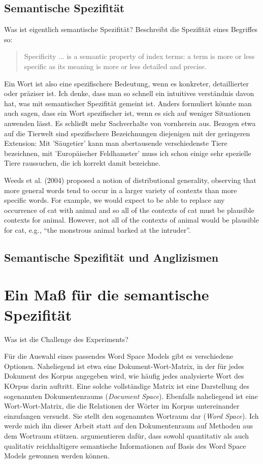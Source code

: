 \documentclass[11pt,numbers=noenddot]{scrartcl}
\begin{document}
\subsection*{Semantische Spezifität}
Was ist eigentlich semantische Spezifität? \citet[11]{sparckjones1972} Beschreibt die Spezifität eines Begriffes so:
\begin{quote}
  Specificity ... is a semantic property of index terms: a term is more or less specific as its meaning is more or less detailed and precise.
\end{quote}

Ein Wort ist also eine spezifischere Bedeutung, wenn es konkreter, detaillierter oder präziser ist. Ich denke, dass man so schnell ein intuitives verständnis davon hat, was mit semantischer Spezifität gemeint ist. Anders formuliert könnte man auch sagen, dass ein Wort spezifischer ist, wenn es sich auf weniger Situationen anwenden lässt. Es schließt mehr Sachverhalte von vornherein aus. Bezogen etwa auf die Tierwelt sind spezifischere Bezeichnungen diejenigen mit der geringeren Extension: Mit 'Säugetier' kann man abertausende verschiedenste Tiere bezeichnen, mit 'Europäischer Feldhamster' muss ich schon einige sehr spezielle Tiere raussuchen, die ich korrekt damit bezeichne.



Weeds et al. (2004) proposed a notion of distributional generality, observing that more general words tend to occur in a larger variety of contexts than more specific words. For example, we would expect to be able to replace any occurrence of cat with animal and so all of the contexts of cat must be plausible
contexts for animal. However, not all of the contexts of animal would be plausible for cat, e.g., “the monstrous animal barked at the intruder”.
\subsection*{Semantische Spezifität und Anglizismen}

\section{Ein Maß für die semantische Spezifität}

Was ist die Challenge des Experiments?

Für die Auswahl eines passendes Word Space Models gibt es verschiedene Optionen. Naheliegend ist etwa eine Dokument-Wort-Matrix, in der für jedes Dokument des Korpus angegeben wird, wie häufig jedes analysierte Wort des KOrpus darin auftritt. Eine solche vollständige Matrix ist eine Darstellung des sogenannten Dokumentenraums (\emph{Document Space})\citep[S.296]{manning1999}. Ebenfalls naheliegend ist eine Wort-Wort-Matrix, die die Relationen der Wörter im Korpus untereinander einzufangen versucht. Sie stellt den sogenannten Wortraum dar (\emph{Word Space}). Ich werde mich ihn dieser Arbeit statt auf den Dokumentenraum auf Methoden aus dem Wortraum stützen. \citet{Schutze:1994:CTT:2856823.2856847} argumentieren dafür, dass sowohl quantitativ als auch qualitativ reichhaltigere semantische Informationen auf Basis des Word Space Models gewonnen werden können.
\end{document}

